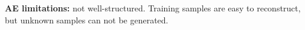 \textbf{AE limitations:} not well-structured. Training samples are easy to reconstruct, but unknown samples can not be generated.

